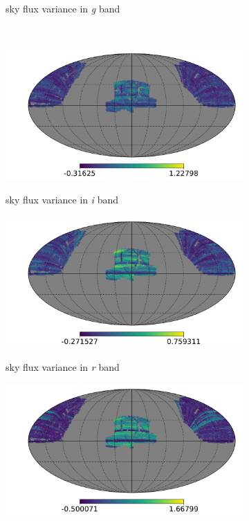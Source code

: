 \begin{figure}
\begin{subfigure}{.33\textwidth}
\label{fig:systmap12}
    \caption{sky flux variance in \textit{g} band}
\end{subfigure}
\\
\begin{subfigure}{.33\textwidth}
  \centering
\includegraphics[scale=0.214]{SystematicMaps2/map_sdss_dr12_systematics_skysigmai.pdf}
\label{fig:systmap13}
    \caption{sky flux variance in \textit{i} band}
\end{subfigure}
\begin{subfigure}{.33\textwidth}
  \centering
\includegraphics[scale=0.214]{SystematicMaps2/map_sdss_dr12_systematics_skysigmar.pdf}
\label{fig:systmap14}
    \caption{sky flux variance in \textit{r} band}
\end{subfigure}
\begin{subfigure}{.33\textwidth}
  \centering
\includegraphics[scale=0.214]{SystematicMaps2/map_sdss_dr12_systematics_skysigmau.pdf}

\end{subfigure}
\end{figure}

